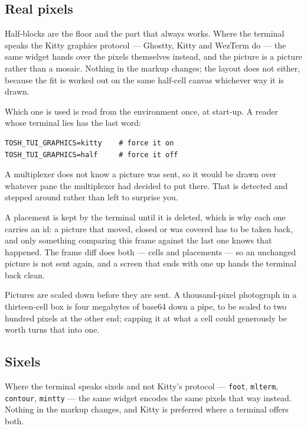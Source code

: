 \documentclass[11pt,a4paper,twoside,openany]{book}
\newcommand{\code}[1]{\texttt{\small #1}}
\begin{document}
\subsection{Real pixels}

Half-blocks are the floor and the part that always works. Where the terminal speaks
the Kitty graphics protocol --- Ghostty, Kitty and WezTerm do --- the same widget
hands over the pixels themselves instead, and the picture is a picture rather than a
mosaic. Nothing in the markup changes; the layout does not either, because the fit is
worked out on the same half-cell canvas whichever way it is drawn.

Which one is used is read from the environment once, at start-up. A reader whose
terminal lies has the last word:

\begin{lstlisting}
TOSH_TUI_GRAPHICS=kitty    # force it on
TOSH_TUI_GRAPHICS=half     # force it off
\end{lstlisting}

\begin{warnbox}
A multiplexer does not know a picture was sent, so it would be drawn over whatever
pane the multiplexer had decided to put there. That is detected and stepped around
rather than left to surprise you.
\end{warnbox}

A placement is kept by the terminal until it is deleted, which is why each one
carries an id: a picture that moved, closed or was covered has to be taken back, and
only something comparing this frame against the last one knows that happened. The
frame diff does both --- cells and placements --- so an unchanged picture is not sent
again, and a screen that ends with one up hands the terminal back clean.

Pictures are scaled down before they are sent. A thousand-pixel photograph in a
thirteen-cell box is four megabytes of base64 down a pipe, to be scaled to two
hundred pixels at the other end; capping it at what a cell could generously be worth
turns that into one.

\subsection{Sixels}

Where the terminal speaks sixels and not Kitty's protocol --- \code{foot},
\code{mlterm}, \code{contour}, \code{mintty} --- the same widget encodes the same
pixels that way instead. Nothing in the markup changes, and Kitty is preferred
where a terminal offers both.
\end{document}
